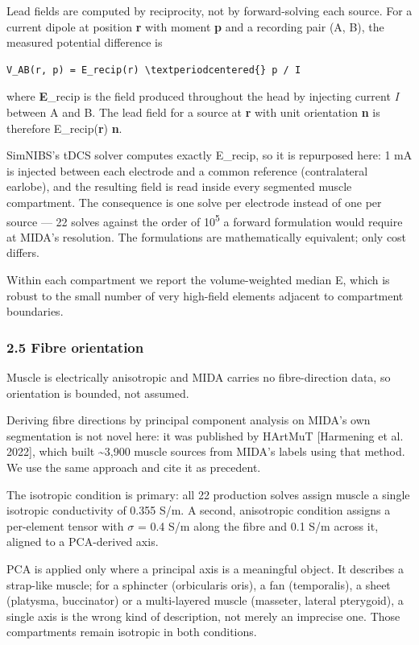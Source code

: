 \documentclass[
  11pt,
  letterpaper,
]{article}
\begin{document}
Lead fields are computed by reciprocity, not by forward-solving each source. For
a current dipole at position \textbf{r} with moment \textbf{p} and a recording pair (A,
B), the measured potential difference is

\begin{verbatim}
V_AB(r, p) = E_recip(r) \textperiodcentered{} p / I
\end{verbatim}

where \textbf{E}\_recip is the field produced throughout the head by injecting current
\emph{I} between A and B. The lead field for a source at \textbf{r} with unit orientation
\textbf{n} is therefore E\_recip(\textbf{r}) \textperiodcentered{} \textbf{n}.

SimNIBS's tDCS solver computes exactly E\_recip, so it is repurposed here: 1 mA
is injected between each electrode and a common reference (contralateral
earlobe), and the resulting field is read inside every segmented muscle
compartment. The consequence is one solve per electrode instead of one per
source --- 22 solves against the order of 10\textsuperscript{5} a forward formulation would require
at MIDA's resolution. The formulations are mathematically equivalent; only cost
differs.

Within each compartment we report the volume-weighted median \textbar E\textbar, which is
robust to the small number of very high-field elements adjacent to compartment
boundaries.

\subsubsection{2.5 Fibre orientation}\label{fibre-orientation}

Muscle is electrically anisotropic and MIDA carries no fibre-direction data, so
orientation is bounded, not assumed.

Deriving fibre directions by principal component analysis on MIDA's own
segmentation is not novel here: it was published by HArtMuT {[}Harmening et al.
2022{]}, which built \textasciitilde3,900 muscle sources from MIDA's labels using that method.
We use the same approach and cite it as precedent.

The isotropic condition is primary: all 22 production solves assign muscle a
single isotropic conductivity of 0.355 S/m. A second, anisotropic condition
assigns a per-element tensor with $\sigma$ = 0.4 S/m along the fibre and 0.1 S/m across
it, aligned to a PCA-derived axis.

PCA is applied only where a principal axis is a meaningful object. It describes
a strap-like muscle; for a sphincter (orbicularis oris), a fan (temporalis), a
sheet (platysma, buccinator) or a multi-layered muscle (masseter, lateral
pterygoid), a single axis is the wrong kind of description, not merely an
imprecise one. Those compartments remain isotropic in both conditions.
\end{document}
